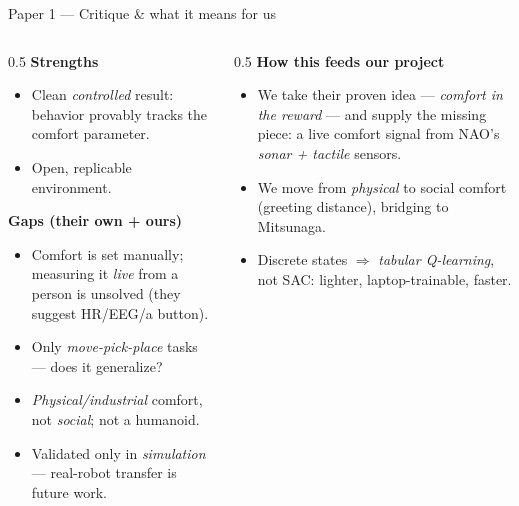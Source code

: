 \documentclass[aspectratio=169,10pt]{beamer}
\begin{document}
\begin{frame}{Paper 1 --- Critique \& what it means for us}
  \begin{columns}[T]
    \begin{column}{0.5\textwidth}
      \textbf{Strengths}
      \begin{itemize}\footnotesize
        \item Clean \emph{controlled} result: behavior provably tracks the comfort parameter.
        \item Open, replicable environment.
      \end{itemize}
      \textbf{Gaps (their own + ours)}
      \begin{itemize}\footnotesize
        \item \alert{Comfort is set manually}; measuring it \emph{live} from a person is unsolved (they suggest HR/EEG/a button).
        \item Only \emph{move-pick-place} tasks --- does it generalize?
        \item \emph{Physical/industrial} comfort, not \emph{social}; not a humanoid.
        \item Validated only in \emph{simulation} --- real-robot transfer is future work.
      \end{itemize}
    \end{column}
    \begin{column}{0.5\textwidth}
      \textbf{How this feeds our project}
      \begin{itemize}\footnotesize
        \item We take their proven idea --- \emph{comfort in the reward} --- and supply the missing piece: a \alert{live} comfort signal from NAO's \emph{sonar + tactile} sensors.
        \item We move from \emph{physical} to \alert{social} comfort (greeting distance), bridging to Mitsunaga.
        \item Discrete states $\Rightarrow$ \emph{tabular Q-learning}, not SAC: lighter, laptop-trainable, faster.
      \end{itemize}
    \end{column}
  \end{columns}
\end{frame}
\end{document}
